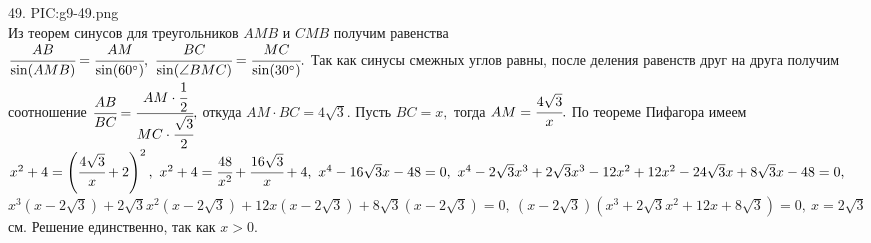 49. {{PIC:g9-49.png}}\\
Из теорем синусов для треугольников $AMB$ и $CMB$ получим равенства\\ $\cfrac{AB}{\sin(AMB)}=\cfrac{AM}{\sin(60^\circ)},\ \cfrac{BC}{\sin(\angle BMC)}= \cfrac{MC}{\sin(30^\circ)}.$ Так как синусы смежных углов равны, после деления равенств друг на друга получим соотношение $\cfrac{AB}{BC}=\cfrac{AM\cdot\cfrac{1}{2}}{MC\cdot\cfrac{\sqrt{3}}{2}},$ откуда $AM\cdot BC=4\sqrt{3}.$ Пусть $BC=x,$ тогда $AM=\cfrac{4\sqrt{3}}{x}.$ По теореме Пифагора имеем $x^2+4=\left(\cfrac{4\sqrt{3}}{x}+2\right)^2,\ x^2+4=\cfrac{48}{x^2}+\cfrac{16\sqrt{3}}{x}+4,\ x^4-16\sqrt{3}x-48=0,\ x^4-2\sqrt{3}x^3+2\sqrt{3}x^3-12x^2+12x^2-24\sqrt{3}x+8\sqrt{3}x-48=0,$\\
$x^3(x-2\sqrt{3})+2\sqrt{3}x^2(x-2\sqrt{3})+12x(x-2\sqrt{3})+8\sqrt{3}(x-2\sqrt{3})=0,\ (x-2\sqrt{3})(x^3+2\sqrt{3}x^2+12x+8\sqrt{3})=0,\ x=2\sqrt{3}$см. Решение единственно, так как $x>0.$\\
